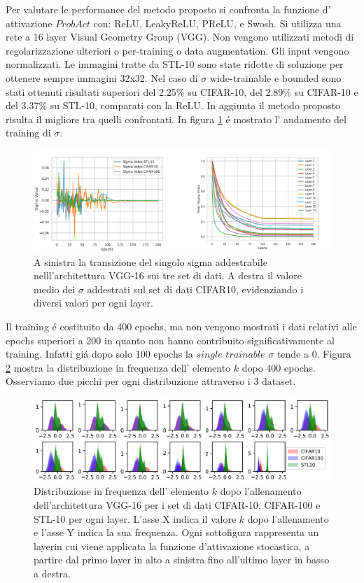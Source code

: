 \documentclass[a4paper,10pt]{article}
\begin{document}
  Per valutare le performance del metodo proposto si confronta la funzione d' attivazione $ProbAct$ con: ReLU, LeakyReLU, PReLU, e Swosh\cite{ramachandran2017searching}. Si utilizza una rete a 16 layer Visual Geometry Group (VGG). Non vengono utilizzati metodi di regolarizzazione ulteriori o per-training o data augmentation. Gli input vengono normalizzati. Le immagini tratte da STL-10 sono state ridotte di soluzione per ottenere sempre immagini 32x32.
  Nel caso di $\sigma$ wide-trainable e bounded sono stati ottenuti risultati superiori del 2.25\% su CIFAR-10, del 2.89\% su CIFAR-10 e del 3.37\% su STL-10, comparati con la ReLU. In aggiunta il metodo proposto risulta il migliore tra quelli confrontati.
  In figura \ref{SigmaTrainingpng} \'e mostrato l' andamento del training di $\sigma$. 
  \begin{figure}[h!]
   \centering
   \includegraphics[width=\linewidth]{SigmaTraining.png} 
   \caption{A sinistra la transizione del singolo sigma addestrabile nelll'architettura VGG-16 sui tre set di dati. A destra il valore medio dei $\sigma$ addestrati sul set di dati CIFAR10, evidenziando i diversi valori per ogni layer.}
  \label{SigmaTrainingpng}
  \end{figure}

  
  Il training \'e costituito da 400 epochs, ma non vengono mostrati i dati relativi alle epochs superiori a 200 in quanto non hanno contribuito significativamente al training. Infatti gi\'a dopo solo 100 epochs la $single$ $trainable$ $\sigma$ tende a 0. 
  Figura \ref{kFreqDistrpng} mostra la distribuzione in frequenza dell' elemento $k$ dopo 400 epochs. Osserviamo due picchi per ogni distribuzione attraverso i 3 dataset.  
  \begin{figure}[h!]
   \centering
   \includegraphics[width=\linewidth]{kFreqDistr.png} 
   \caption{Distribuzione in frequenza dell' elemento $k$ dopo l'allenamento dell'architettura VGG-16 per i set di dati CIFAR-10, CIFAR-100 e STL-10 per ogni layer. L'asse X indica il valore $k$ dopo l'allenamento e l'asse Y indica la sua frequenza. Ogni sottofigura rappresenta un layerin cui viene applicata la funzione d'attivazione stocastica, a partire dal primo layer in alto a sinistra fino all'ultimo layer in basso a destra.}
  \label{kFreqDistrpng}
  \end{figure}
  
\end{document}
